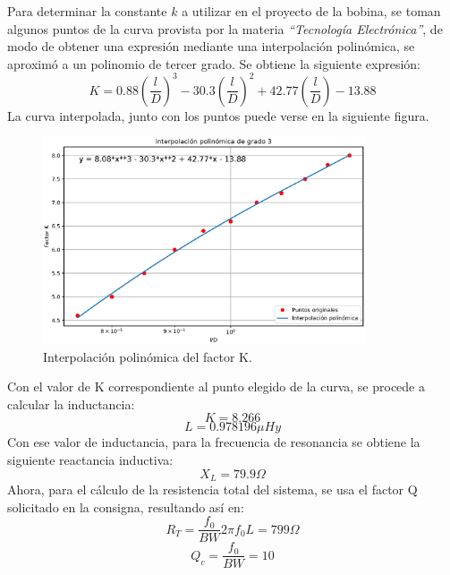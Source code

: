 \documentclass{article}
\begin{document}
Para determinar la constante $k$ a utilizar en el proyecto de la bobina, se toman algunos puntos de la curva provista por la materia \textit{“Tecnología Electrónica”}, de modo de obtener una expresión mediante una interpolación polinómica, se aproximó a un polinomio de tercer grado. Se obtiene la siguiente expresión:
\begin{equation*}
    K = 0.88 \left( \frac{l}{D} \right)^3 - 30.3 \left( \frac{l}{D} \right)^2 + 42.77 \left( \frac{l}{D} \right) - 13.88
\end{equation*}
\noindent La curva interpolada, junto con los puntos puede verse en la siguiente figura.
\begin{figure}[H]
\centering
\includegraphics[width=0.85\textwidth]{./img/figura11.eps}
\caption{Interpolación polinómica del factor K.}
\label{fig:circuito11}
\end{figure}
\noindent Con el valor de K correspondiente al punto elegido de la curva, se procede a calcular la inductancia:
\begin{equation*}
    K = 8.266
\end{equation*}
\begin{equation*}
    L = 0.978196 \mu Hy 
\end{equation*}
\noindent Con ese valor de inductancia, para la frecuencia de resonancia se obtiene la siguiente reactancia inductiva:
\begin{equation*}
    X_L = 79.9 \Omega
\end{equation*}
\noindent Ahora, para el cálculo de la resistencia total del sistema, se usa el factor Q solicitado en la consigna, resultando así en:
\begin{equation*}
    R_T = \frac{f_0}{BW} 2\pi f_0L = 799 \Omega
\end{equation*}
\begin{equation*}
    Q_c = \frac{f_0}{BW} = 10
\end{equation*}
\end{document}
